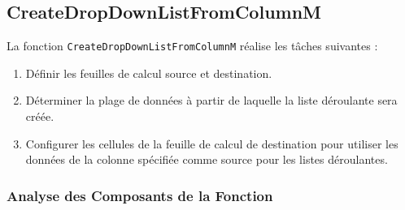 \documentclass[a4paper, oneside, 12pt, final]{extreport}
\begin{document}
\subsection{CreateDropDownListFromColumnM}

La fonction \texttt{CreateDropDownListFromColumnM} réalise les tâches suivantes :

\begin{enumerate}
    \item Définir les feuilles de calcul source et destination.
    \item Déterminer la plage de données à partir de laquelle la liste déroulante sera créée.
    \item Configurer les cellules de la feuille de calcul de destination pour utiliser les données de la colonne spécifiée comme source pour les listes déroulantes.
\end{enumerate}

\subsubsection{Analyse des Composants de la Fonction}
\end{document}
